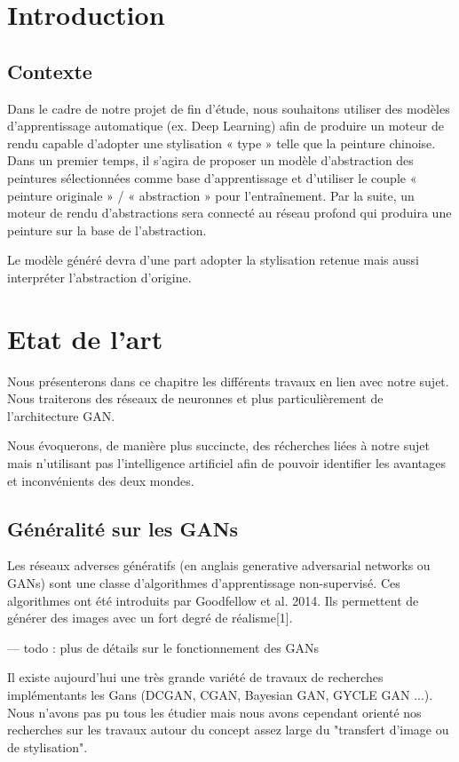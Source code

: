 \documentclass[a4paper, 12pt]{book}
\begin{document}
\mainmatter
\chapter*{Introduction}

\section{Contexte}
Dans le cadre de notre projet de fin d'étude, nous souhaitons utiliser des modèles d’apprentissage automatique (ex. Deep Learning) afin de produire un moteur de rendu capable d’adopter une stylisation « type » telle que la peinture chinoise. Dans un premier temps, il s’agira de proposer un modèle d’abstraction des peintures sélectionnées comme base d’apprentissage et d’utiliser le couple « peinture originale » / « abstraction » pour l’entraînement. Par la suite, un moteur de rendu d’abstractions sera connecté au réseau profond qui produira une peinture sur la base de l’abstraction.

Le modèle généré devra d'une part adopter la stylisation retenue mais aussi interpréter l'abstraction d'origine.


\chapter{Etat de l'art}
Nous présenterons dans ce chapitre les différents travaux en lien avec notre sujet. Nous traiterons des réseaux de neuronnes et plus particulièrement de l'architecture GAN. 

Nous évoquerons, de manière plus succincte, des récherches liées à notre sujet mais n'utilisant pas l'intelligence artificiel afin de pouvoir identifier les avantages et inconvénients des deux mondes. 


\section{Généralité sur les GANs}
Les réseaux adverses génératifs (en anglais generative adversarial networks ou GANs) sont une classe d'algorithmes d'apprentissage non-supervisé. Ces algorithmes ont été introduits par Goodfellow et al. 2014. Ils permettent de générer des images avec un fort degré de réalisme[1].

--- todo : plus de détails sur le fonctionnement des GANs

Il existe aujourd'hui une très grande variété de travaux de recherches implémentants les Gans (DCGAN, CGAN, Bayesian GAN, GYCLE GAN ...). Nous n'avons pas pu tous les étudier mais nous avons cependant orienté nos recherches sur les travaux autour du concept assez large du "transfert d'image ou de stylisation".
\end{document}
